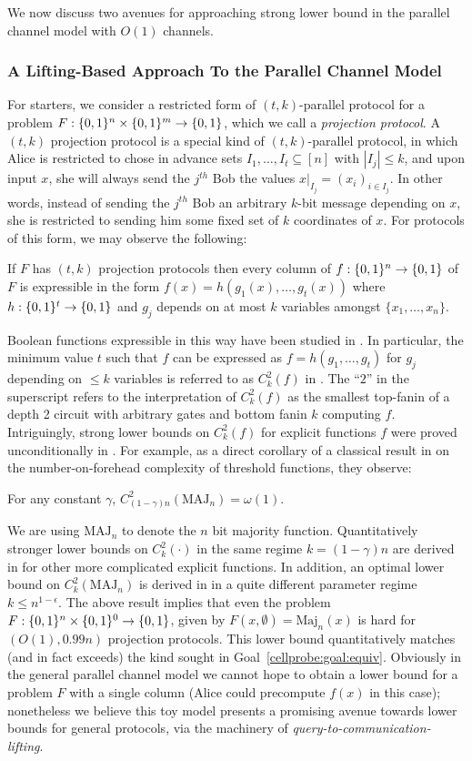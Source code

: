 We now discuss two avenues for approaching strong lower bound in the parallel channel model with $O(1)$ channels.
\subsubsection{A Lifting-Based Approach To the Parallel Channel Model}
For starters, we consider a restricted form of $(t,k)$-parallel protocol for a problem $F: \{0,1\}^n \times \{0,1\}^m \to \{0,1\}$, which we call a \emph{projection protocol}. A $(t,k)$ projection protocol is a special kind of $(t,k)$-parallel protocol, in which Alice is restricted to chose in advance sets $I_1,\ldots,I_t \subseteq [n]$ with $|I_j| \leq k$, and upon input $x$, she will always send the $j^{th}$ Bob the values $x|_{I_j} =(x_i)_{i \in I_j}$. In other words, instead of sending the $j^{th}$ Bob an arbitrary $k$-bit message depending on $x$, she is restricted to sending him some fixed set of $k$ coordinates of $x$.
For protocols of this form, we may observe the following:
\begin{claim}
If $F$ has $(t,k)$ projection protocols then every column of $f: \{0,1\}^n \to \{0,1\}$ of $F$ is expressible in the form $f(x) = h(g_1(x),\ldots,g_t(x))$ where $h: \{0,1\}^t \to \{0,1\}$ and $g_j$ depends on at most $k$ variables amongst $\{x_1,\ldots,x_n\}$.
\end{claim}
Boolean functions expressible in this way have been studied in \cite{hrubes-rao,lecomte2022composition}. In particular, the minimum value $t$ such that $f$ can be expressed as $f = h(g_1,\ldots,g_t)$ for $g_j$ depending on $\leq k$ variables is referred to as $C^2_k(f)$ in \cite{hrubes-rao}. The ``$2$'' in the superscript refers to the interpretation of $C^2_k(f)$ as the smallest top-fanin of a depth 2 circuit with arbitrary gates and bottom fanin $k$ computing $f$. Intriguingly, strong lower bounds on $C^2_k(f)$ for explicit functions $f$ were proved unconditionally in \cite{hrubes-rao}. For example, as a direct corollary of a classical result in \cite{cfl} on the number-on-forehead complexity of threshold functions, they observe:
\begin{lemma*}
For any constant $\gamma$, $C^2_{(1-\gamma)n}(\mathrm{MAJ}_n) =\omega(1)$.
\end{lemma*}
We are using $\mathrm{MAJ}_n$ to denote the $n$ bit majority function. Quantitatively stronger lower bounds on $C^2_k(\cdot)$ in the same regime $k = (1-\gamma)n$ are derived in \cite{hrubes-rao} for other more complicated explicit functions. In addition, an optimal lower bound on $C^2_{k}(\mathrm{MAJ}_n)$ is derived in \cite{lecomte2022composition} in a quite different parameter regime $k \leq n^{1-\epsilon}$. The above result implies that even the problem $F: \{0,1\}^n \times \{0,1\}^0 \to \{0,1\}$, given by $F(x,\emptyset) = \mathrm{Maj}_n(x)$ is hard for $(O(1),0.99n)$ projection protocols. This lower bound quantitatively matches (and in fact exceeds) the kind sought in Goal~\ref{cellprobe:goal:equiv}. Obviously in the general parallel channel model we cannot hope to obtain a lower bound for a problem $F$ with a single column (Alice could precompute $f(x)$ in this case); nonetheless we believe this toy model presents a promising avenue towards lower bounds for general protocols, via the machinery of \emph{query-to-communication-lifting}.
